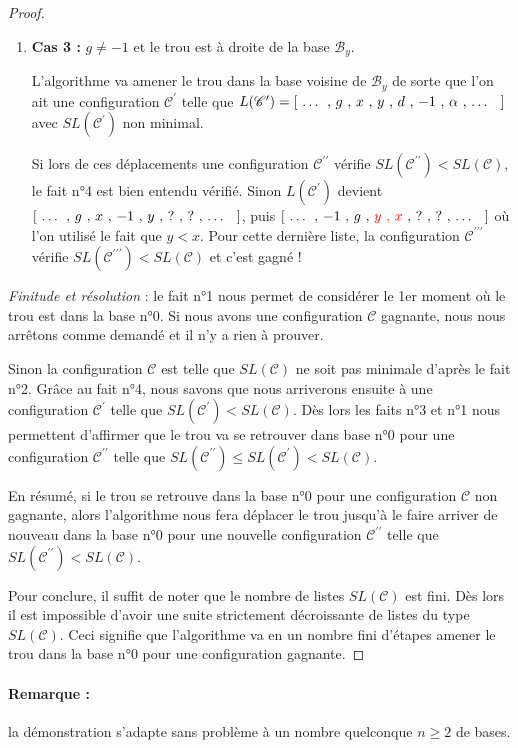 \begin{proof}
\begin{enumerate}
		\item \textbf{Cas 3 :} $g \neq -1$ et le trou est à droite de la base $\mathcal{B}_y$. 
		
		L'algorithme va amener le trou dans la base voisine de $\mathcal{B}_y$ de sorte que l'on ait une configuration $\mathscr{C}^\prime$ telle que $L(\mathscr{C}^\prime) = [ \text{\ \dots{} , $g$ , $x$ , $y$ , $d$ , $-1$ , $\alpha$ , \dots{} \ } ]$ avec $SL(\mathscr{C}^\prime)$ non minimal.
		
		Si lors de ces déplacements une configuration $\mathscr{C}^{\prime\prime}$ vérifie $SL(\mathscr{C}^{\prime\prime}) < SL(\mathscr{C})$, le fait n°4 est bien entendu vérifié.
		Sinon $L(\mathscr{C}^\prime)$ devient $[ \text{\ \dots{} , $g$ , $x$ , $-1$ , $y$ , $?$ , $?$ , \dots{} \ } ]$, puis $[ \text{\ \dots{} , $-1$ , $g$ , {\color{red} $y$ , $x$} , $?$ , $?$ , \dots{} \ } ]$ où l'on utilisé le fait que $y < x$. Pour cette dernière liste, la configuration $\mathscr{C}^{\prime\prime\prime}$ vérifie $SL(\mathscr{C}^{\prime\prime\prime}) < SL(\mathscr{C})$ et c'est gagné !
	\end{enumerate}
	

	\medskip

	\textit{Finitude et résolution} : le fait n°1 nous permet de considérer le 1er moment où le trou est dans la base n°0.
	Si nous avons une configuration $\mathscr{C}$ gagnante, nous nous arrêtons comme demandé et il n'y a rien à prouver.


	\medskip
	
	Sinon la configuration $\mathscr{C}$  est telle que $SL(\mathscr{C})$ ne soit pas minimale d'après le fait n°2.
	Grâce au fait n°4, nous savons que nous arriverons ensuite à une configuration $\mathscr{C}^\prime$ telle que $SL(\mathscr{C}^\prime) < SL(\mathscr{C})$.
	Dès lors les faits n°3 et n°1 nous permettent d'affirmer que le trou va se retrouver dans base n°0 pour une configuration $\mathscr{C}^{\prime\prime}$ telle que $SL(\mathscr{C}^{\prime\prime}) \leqslant SL(\mathscr{C}^\prime) < SL(\mathscr{C})$. 


	\medskip
	
	En résumé, si le trou se retrouve dans la base n°0 pour une configuration $\mathscr{C}$ non gagnante, alors l'algorithme nous fera déplacer le trou jusqu'à le faire arriver de nouveau dans la base n°0 pour une nouvelle configuration $\mathscr{C}^{\prime\prime}$ telle que $SL(\mathscr{C}^{\prime\prime}) < SL(\mathscr{C})$.
	
	
	\medskip
	
	Pour conclure, il suffit de noter que le nombre de listes $SL(\mathscr{C})$ est fini.
	Dès lors il est impossible d'avoir une suite strictement décroissante de listes du type $SL(\mathscr{C})$.
	Ceci signifie que l'algorithme va en un nombre fini d'étapes amener le trou dans la base n°0 pour une configuration gagnante.  
\end{proof}


\paragraph{Remarque :} \hspace{-1em} la démonstration s'adapte sans problème à un nombre quelconque $n \geqslant 2$ de bases.